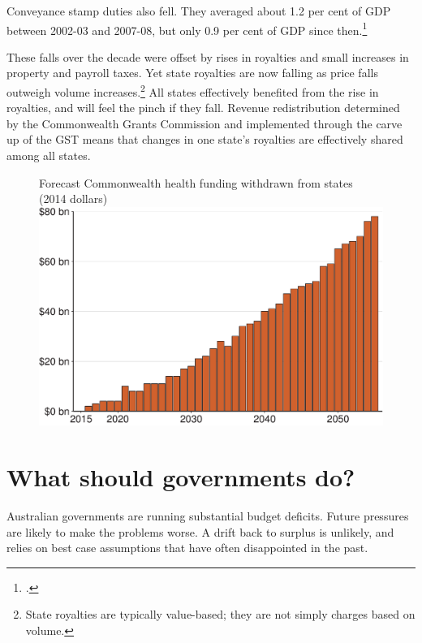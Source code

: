 \documentclass[twoside,english]{grattanBudgetRepairb5portrait}
\begin{document}
Conveyance stamp duties also fell. They averaged about 1.2 per cent of GDP between 2002-03 and 2007-08, but only 0.9 per cent of GDP since then.\footcite{PBO2015a} 

These falls over the decade were offset by rises in royalties and small increases in property and payroll taxes. Yet state royalties are now falling as price falls outweigh volume increases.\footnote{State royalties are typically value-based; they are not simply charges based on volume.}  All states effectively benefited from the rise in royalties, and will feel the pinch if they fall. Revenue redistribution determined by the Commonwealth Grants Commission and implemented through the carve up of the GST means that changes in one state’s royalties are effectively shared among all states.

\begin{figure}[hbp]
%
{Forecast Commonwealth health funding withdrawn from states (2014 dollars)}
\includegraphics[width=\columnwidth]{Fiscal-challenges/figure/Figure15-1.pdf}
\end{figure}

\chapter{What should governments do?}
Australian governments are running substantial budget deficits. Future pressures are likely to make the problems worse. A drift back to surplus is unlikely, and relies on best case assumptions that have often disappointed in the past. 
\end{document}
